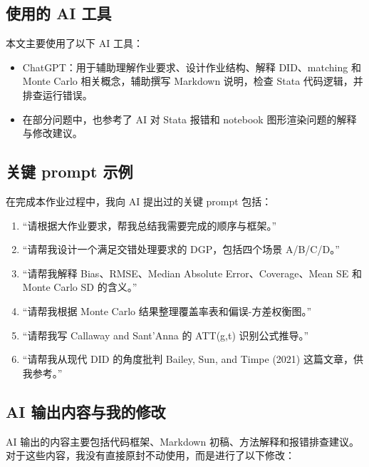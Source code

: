 \documentclass[
  fontset=windows]{ctexart}
\providecommand{\tightlist}{%
  \setlength{\itemsep}{0pt}\setlength{\parskip}{0pt}}
\begin{document}
\subsection{使用的 AI 工具}\label{ux4f7fux7528ux7684-ai-ux5de5ux5177}

本文主要使用了以下 AI 工具：

\begin{itemize}
\tightlist
\item
  ChatGPT：用于辅助理解作业要求、设计作业结构、解释 DID、matching 和
  Monte Carlo 相关概念，辅助撰写 Markdown 说明，检查 Stata
  代码逻辑，并排查运行错误。
\item
  在部分问题中，也参考了 AI 对 Stata 报错和 notebook
  图形渲染问题的解释与修改建议。
\end{itemize}

\subsection{关键 prompt 示例}\label{ux5173ux952e-prompt-ux793aux4f8b}

在完成本作业过程中，我向 AI 提出过的关键 prompt 包括：

\begin{enumerate}
\def\labelenumi{\arabic{enumi}.}
\tightlist
\item
  ``请根据大作业要求，帮我总结我需要完成的顺序与框架。''
\item
  ``请帮我设计一个满足交错处理要求的 DGP，包括四个场景 A/B/C/D。''
\item
  ``请帮我解释 Bias、RMSE、Median Absolute Error、Coverage、Mean SE 和
  Monte Carlo SD 的含义。''
\item
  ``请帮我根据 Monte Carlo 结果整理覆盖率表和偏误-方差权衡图。''
\item
  ``请帮我写 Callaway and Sant'Anna 的 ATT(g,t) 识别公式推导。''
\item
  ``请帮我从现代 DID 的角度批判 Bailey, Sun, and Timpe (2021)
  这篇文章，供我参考。''
\end{enumerate}

\subsection{AI
输出内容与我的修改}\label{ai-ux8f93ux51faux5185ux5bb9ux4e0eux6211ux7684ux4feeux6539}

AI 输出的内容主要包括代码框架、Markdown
初稿、方法解释和报错排查建议。对于这些内容，我没有直接原封不动使用，而是进行了以下修改：
\end{document}
